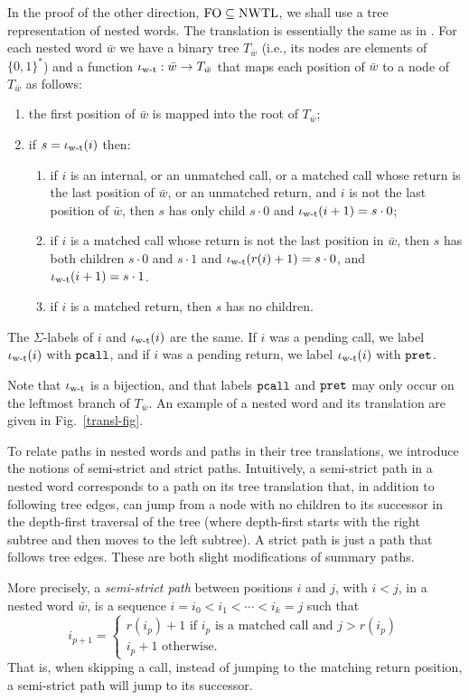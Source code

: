 \documentclass{LMCS}
\newcommand{\w}{{\bar{w}}}
\newcommand{\FO}{{\rm FO}}
\newcommand{\wt}{\iota_{\text{\rm w-t}}}
\theoremstyle{plain}
\theoremstyle{definition}
\newcommand{\pret}{\tt{pret}}
\newcommand{\pcall}{\tt{pcall}}
\newcounter{example}
\begin{document}
In the proof of the other direction, $\FO\subseteq \nwtl$, we shall
use a tree representation of nested words. 
The translation is 
essentially the same as in \cite{nested}. For each nested word $\w$ we
have a binary tree $T_\w$ (i.e., its nodes are elements of $\{0,1\}^*$)
and a function $\wt: \w \to T_\w$ that maps each
position of $\w$ to a node of $T_\w$ as follows:
\begin{enumerate}[$\bullet$]
\item the first position of $\w$ is mapped into the root of $T_\w$;
\item if $s=\wt(i)$ then:
\begin{enumerate}[(1)]
\item if $i$ is an internal, or an unmatched call, or a matched call
  whose return is the last position of $\w$, or an unmatched
  return,
  and $i$ is not the last position of
$\w$, then $s$ has only child $s\cdot 0$ and $\wt(i+1)=s\cdot 0$;
\item if $i$ is a matched call whose return is not the last position
  in $\w$, then $s$ has both children $s\cdot 0$ and
  $s \cdot 1$ and $\wt(r(i)+1)=s\cdot 0$, and 
  $\wt(i+1)=s\cdot 1$.
\item
 if $i$ is a matched return, then $s$ has no children.
\end{enumerate}
\end{enumerate}
The $\Sigma$-labels of $i$ and $\wt(i)$ are the same. 
If $i$ was a pending call, we label $\wt(i)$ with $\pcall$, and if $i$
was a pending return, we label $\wt(i)$ with $\pret$. 

Note that $\wt$
is a bijection, and that labels $\pcall$ and $\pret$ may only occur on
the leftmost branch of $T_\w$. An example of a nested word and its
translation are given in Fig.~\ref{transl-fig}.

To relate paths in nested words and paths in their tree translations,
we introduce the notions of semi-strict and strict paths. Intuitively,
a semi-strict path in a nested word corresponds to a path on
its tree translation that, in addition to following tree edges, can
jump from a node with no children to its successor in the depth-first
traversal of the tree (where depth-first starts with the right subtree
and then moves to the left subtree). A strict path is just a
path that follows tree edges.  These are both slight modifications of
summary paths.

More precisely, 
a {\em semi-strict path}
between positions $i$ and $j$, with $i < j$, in a nested word $\w$, is
a sequence $i = i_0 < i_1 < \cdots < i_k = j$ such that
$$i_{p+1} = 
\begin{cases} 
r(i_p)+1 \text{ if } i_p\text{ is a 
matched call and }j > r(i_p) \\
i_p+1 \text{ otherwise.}
\end{cases}$$
That is, when skipping a call, instead of jumping to the matching return
position, a semi-strict path will jump to its successor. 
\end{document}
